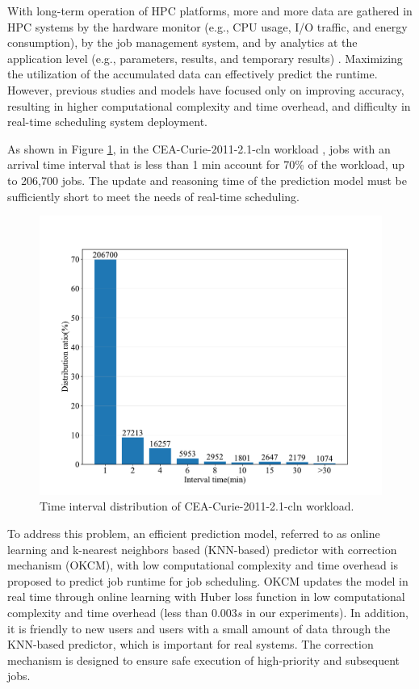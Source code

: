 \documentclass[a4paper,fleqn]{cas-sc}
\begin{document}
With long-term operation of HPC platforms, more and more data are gathered in HPC systems by the hardware monitor (e.g., CPU usage, I/O traffic, and energy consumption), by the job management system, and by analytics at the application level (e.g., parameters, results, and temporary results) \cite{9JSC}. Maximizing the utilization of the accumulated data can effectively predict the runtime. However, previous studies and models have focused only on improving accuracy, resulting in higher computational complexity and time overhead, and difficulty in real-time scheduling system deployment. 

As shown in Figure \ref{FIG:1}, in the CEA-Curie-2011-2.1-cln workload \cite{10JPDC}, jobs with an arrival time interval that is less than 1 min account for 70\% of the workload, up to 206,700 jobs. The update and reasoning time of the prediction model must be sufficiently short to meet the needs of real-time scheduling. 

\begin{figure}
	\centering
	\includegraphics[scale=.35]{figs/Fig1.pdf}
	\caption{Time interval distribution of CEA-Curie-2011-2.1-cln workload.}
	\label{FIG:1}
\end{figure}

To address this problem, an efficient prediction model, referred to as online learning and k-nearest neighbors based (KNN-based) predictor with correction mechanism (OKCM), with low computational complexity and time overhead is proposed to predict job runtime for job scheduling. OKCM updates the model in real time through online learning with Huber loss function in low computational complexity and time overhead (less than $0.003s$ in our experiments). In addition, it is friendly to new users and users with a small amount of data through the KNN-based predictor, which is important for  real systems. The correction mechanism is designed to ensure safe execution of high-priority and subsequent jobs. 
\end{document}
